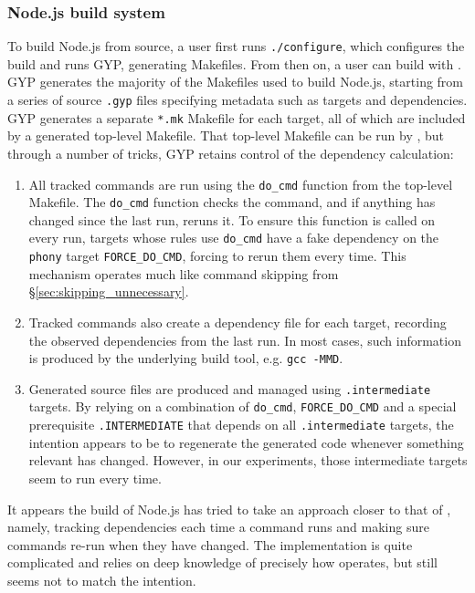 \subsubsection{Node.js build system}

To build Node.js from source, a user first runs \texttt{./configure}, which configures the build and runs GYP, generating Makefiles. From then on, a user can build with \Make. GYP generates the majority of the Makefiles used to build Node.js, starting from a series of source \texttt{.gyp} files specifying metadata such as targets and dependencies. GYP generates a separate \texttt{*.mk} Makefile for each target, all of which are included by a generated top-level Makefile. That top-level Makefile can be run by \Make, but through a number of tricks, GYP retains control of the dependency calculation:

\begin{enumerate}
\item All tracked commands are run using the \texttt{do\_cmd} function from the top-level Makefile. The \texttt{do\_cmd} function checks the command, and if anything has changed since the last run, reruns it. To ensure this function is called on every run, targets whose rules use \texttt{do\_cmd} have a fake dependency on the \texttt{phony} target \texttt{FORCE\_DO\_CMD}, forcing \Make to rerun them every time. This mechanism operates much like \Rattle command skipping from \S\ref{sec:skipping_unnecessary}.
\item Tracked commands also create a dependency file for each target, recording the observed dependencies from the last run. In most cases, such information is produced by the underlying build tool, e.g. \texttt{gcc -MMD}.
\item Generated source files are produced and managed using \texttt{.intermediate} targets. By relying on a combination of \texttt{do\_cmd}, \texttt{FORCE\_DO\_CMD} and a special prerequisite \texttt{.INTERMEDIATE} that depends on all \texttt{.intermediate} targets, the intention appears to be to regenerate the generated code whenever something relevant has changed. However, in our experiments, those intermediate targets seem to run every time.
\end{enumerate}

It appears the build of Node.js has tried to take an approach closer to that of \Rattle, namely, tracking dependencies each time a command runs and making sure commands re-run when they have changed.  The implementation is quite complicated and relies on deep knowledge of precisely how \Make operates, but still seems not to match the intention.


